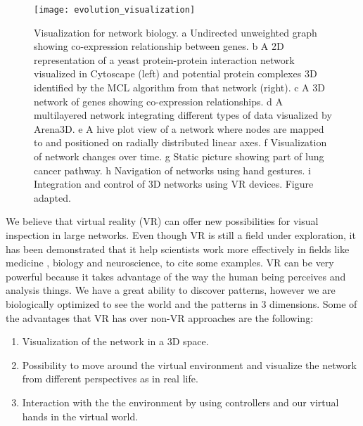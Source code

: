 \begin{figure}[h!]
    \newlength{\tempheight}
    \setlength{\tempheight}{15ex}
    \centering%
    \texttt{[image: evolution\_visualization]}
    \caption{Visualization for network biology. a Undirected unweighted graph showing co-expression relationship between genes. b A 2D representation of a yeast protein-protein interaction network visualized in Cytoscape (left) and potential protein complexes 3D identified by the MCL algorithm from that network (right). c A 3D network of genes showing co-expression relationships. d A multilayered network integrating different types of data visualized by Arena3D. e A hive plot view of a network where nodes are mapped to and positioned on radially distributed linear axes. f Visualization of network changes over time. g Static picture showing part of lung cancer pathway. h Navigation of networks using hand gestures. i Integration and control of 3D networks using VR devices. Figure adapted\cite{pavlopoulos_malliarakis_papanikolaou_theodosiou_enright_iliopoulos_2015}.}
    \label{fig:network_biology_evolution}
\end{figure}%

We believe that virtual reality (VR) can offer new possibilities for visual inspection in large networks. Even though VR is still a field under exploration, it has been demonstrated that it help scientists work more effectively in fields like medicine \cite{Laver11}\cite{xia_ip_samman_wong_gateno_wang_yeung_kot_tideman_2001}\cite{brain_damage_rehab}, biology\cite{10.1093/bioinformatics/bti581}\cite{thorley_lawson_duca_shapiro_2008} and neuroscience\cite{bohil_alicea_biocca_2011}\cite{minderer_harvey_donato_moser_2016}, to  cite some examples. VR can be very powerful because it takes advantage of the way the human being perceives and analysis things. We have a great ability to discover patterns, however we are biologically optimized to see the world and the patterns in 3 dimensions. Some of the advantages that VR has over non-VR approaches are the following:

\begin{enumerate}
  \item Visualization of the network in a 3D space.
  \item Possibility to move around the virtual environment and visualize the network from different perspectives as in real life.
  \item Interaction with the the environment by using controllers and our virtual hands in the virtual world.
\end{enumerate}

